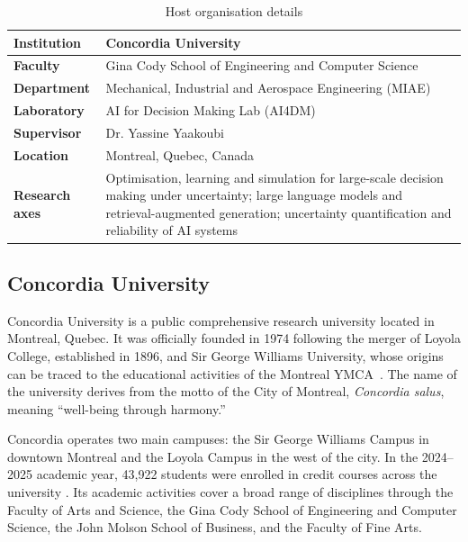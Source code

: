 \begin{table}[H]
\centering
\caption{Host organisation details}
\label{tab:host-organization}
\begin{tabular}{|l|>{\raggedright\arraybackslash}m{9cm}|}
\hline
\textbf{Institution}   & Concordia University \\ \hline
\textbf{Faculty}       & Gina Cody School of Engineering and Computer Science \\ \hline
\textbf{Department}    & Mechanical, Industrial and Aerospace Engineering (MIAE) \\ \hline
\textbf{Laboratory}    & AI for Decision Making Lab (AI4DM) \\ \hline
\textbf{Supervisor}    & Dr. Yassine Yaakoubi \\ \hline
\textbf{Location}      & Montreal, Quebec, Canada \\ \hline
\textbf{Research axes} & Optimisation, learning and simulation for large-scale
                         decision making under uncertainty; large language models
                         and retrieval-augmented generation; uncertainty
                         quantification and reliability of AI systems \\ \hline
\end{tabular}
\end{table}

\subsection{Concordia University}
\label{subsec:ch1-concordia}

Concordia University is a public comprehensive research university located in Montreal, Quebec. 
It was officially founded in 1974 following the merger of Loyola College, established in 1896, 
and Sir George Williams University, whose origins can be traced to the educational activities of the 
Montreal YMCA~. The name of the university derives from the motto of the City 
of Montreal, \emph{Concordia salus}, meaning ``well-being through harmony.''

Concordia operates two main campuses: the Sir George Williams Campus in downtown Montreal and the 
Loyola Campus in the west of the city. In the 2024--2025 academic year, 43,922 students were enrolled in 
credit courses across the university . Its academic activities cover a broad range of 
disciplines through the Faculty of Arts and Science, the Gina Cody School of Engineering and Computer Science, 
the John Molson School of Business, and the Faculty of Fine Arts.


